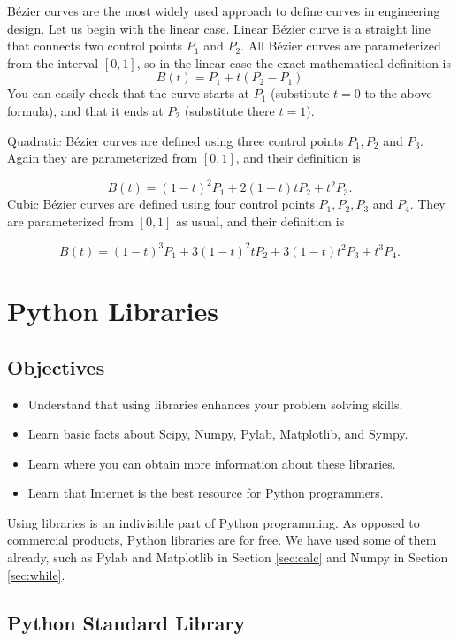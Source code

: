 B\'ezier curves are the most widely used approach to define curves in engineering design. 
Let us begin with the linear case. Linear B\'ezier curve is a straight line that
connects two control points $P_1$ and $P_2$. All B\'ezier curves are parameterized
from the interval $[0, 1]$, so in the linear case the exact mathematical definition is
$$
  B(t) = P_1 + t(P_2 - P_1)
$$ 
You can easily check that the curve starts at $P_1$ (substitute $t = 0$ to the above formula),
and that it ends at $P_2$ (substitute there $t = 1$).

Quadratic B\'ezier curves are defined using three control points $P_1, P_2$ and $P_3$. Again they are
parameterized from $[0, 1]$, and their definition is

$$
  B(t) = (1 - t)^2 P_1 + 2(1 - t)t P_2 + t^2 P_3.
$$ 
Cubic B\'ezier curves are defined using four control points $P_1, P_2, P_3$ and $P_4$. They are
parameterized from $[0, 1]$ as usual, and their definition is

$$
  B(t) = (1 - t)^3 P_1 + 3(1 - t)^2t P_2 + 3(1-t)t^2 P_3 + t^3 P_4.
$$ 

\section{Python Libraries}\label{subsec:importinglib}

\subsection{Objectives}

\begin{itemize}
\item Understand that using libraries enhances your problem solving skills.
\item Learn basic facts about Scipy, Numpy, Pylab, Matplotlib, and Sympy.
\item Learn where you can obtain more information about these libraries.
\item Learn that Internet is the best resource for Python programmers.
\end{itemize}
Using libraries is an indivisible part of Python programming. As opposed to 
commercial products, Python libraries are for free. We have used some of them
already, such as Pylab and Matplotlib in Section \ref{sec:calc} and Numpy 
in Section \ref{sec:while}. 

\subsection{Python Standard Library}

